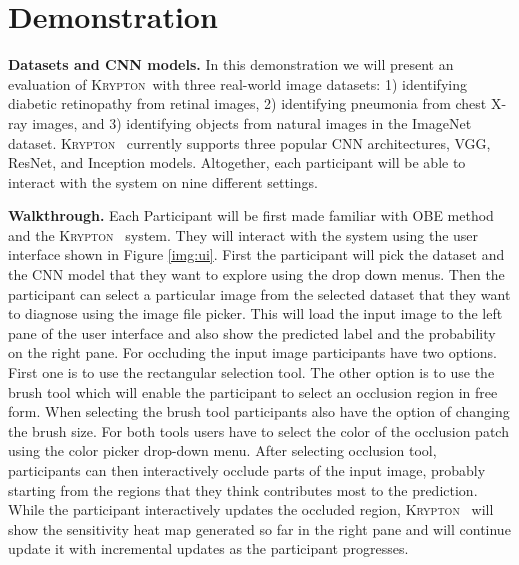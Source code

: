 \documentclass{article}
\newcommand{\system}{\textsc{Krypton}}
\begin{document}
\vspace{-3mm}
\section{Demonstration}\label{demonstration}
\textbf{Datasets and CNN models.} In this demonstration we will present an evaluation of \system ~with three real-world image datasets: 1) identifying diabetic retinopathy from retinal images, 2) identifying pneumonia from chest X-ray images, and 3) identifying objects from natural images in the ImageNet dataset. \system~ currently supports three popular CNN architectures, VGG, ResNet, and Inception models. Altogether, each participant will be able to interact with the system on nine different settings.

\textbf{Walkthrough.} Each Participant will be first made familiar with OBE method and the \system~ system.
They will interact with the system using the user interface shown in Figure \ref{img:ui}.
First the participant will pick the dataset and the CNN model that they want to explore using the drop down menus.
Then the participant can select a particular image from the selected dataset that they want to diagnose using the image file picker. This will load the input image to the left pane of the user interface and also show the predicted label and the probability on the right pane.
For occluding the input image participants have two options. First one is to use the rectangular selection tool. The other option is to use the brush tool which will enable the participant to select an occlusion region in free form.
When selecting the brush tool participants also have the option of changing the brush size. For both tools users have to select the color of the occlusion patch using the color picker drop-down menu.
After selecting occlusion tool, participants can then interactively occlude parts of the input image, probably starting from the regions that they think contributes most to the prediction.
While the participant interactively updates the occluded region, \system~ will show the sensitivity heat map generated so far in the right pane and will continue update it with incremental updates as the participant progresses.

\vspace{-4mm}


\end{document}
